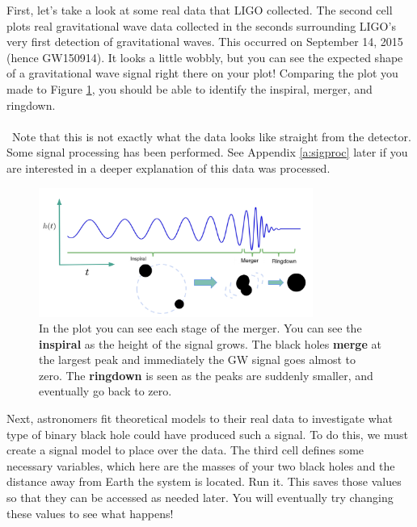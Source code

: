 \documentclass[14pt]{article}
\begin{document}
First, let's take a look at some real data that LIGO collected. The second cell plots real gravitational wave data collected in the seconds surrounding LIGO's very first detection of gravitational waves. This occurred on September 14, 2015 (hence GW150914). It looks a little wobbly, but you can see the expected shape of a gravitational wave signal right there on your plot! Comparing the plot you made to Figure \ref{fig:imr}, you should be able to identify the inspiral, merger, and ringdown. 
\\\\\
\noindent Note that this is not exactly what the data looks like straight from the detector. Some signal processing has been performed. See Appendix \ref{a:sigproc} later if you are interested in a deeper explanation of this data was processed. 

\begin{figure}[h]
    \centering
    \includegraphics[width=0.8\textwidth]{imr.png}
    \caption{In the plot you can see each stage of the merger. You can see the \textbf{inspiral} as the height of the signal grows. The black holes \textbf{merge} at the largest peak and immediately the GW signal goes almost to zero. The \textbf{ringdown} is seen as the peaks are suddenly smaller, and eventually go back to zero.}
    \label{fig:imr}
\end{figure}

\noindent Next, astronomers fit theoretical models to their real data to investigate what type of binary black hole could have produced such a signal. To do this, we must create a signal model to place over the data. The third cell  defines some necessary variables, which here are the masses of your two black holes and the distance away from Earth the system is located. Run it. This saves those values so that they can be accessed as needed later. You will eventually try changing these values to see what happens!

\vspace{2mm}
\end{document}
